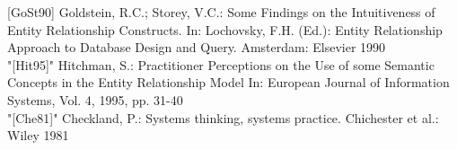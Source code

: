 [GoSt90] Goldstein, R.C.; Storey, V.C.: Some Findings on the Intuitiveness of Entity Relationship Constructs.
In: Lochovsky, F.H. (Ed.): Entity Relationship Approach to Database Design and
Query. Amsterdam: Elsevier 1990 \\
"[Hit95]" Hitchman, S.: Practitioner Perceptions on the Use of some Semantic Concepts in the Entity
Relationship Model In: European Journal of Information Systems, Vol. 4, 1995, pp. 31-40\\
"[Che81]" Checkland, P.: Systems thinking, systems practice. Chichester et al.: Wiley 1981\\